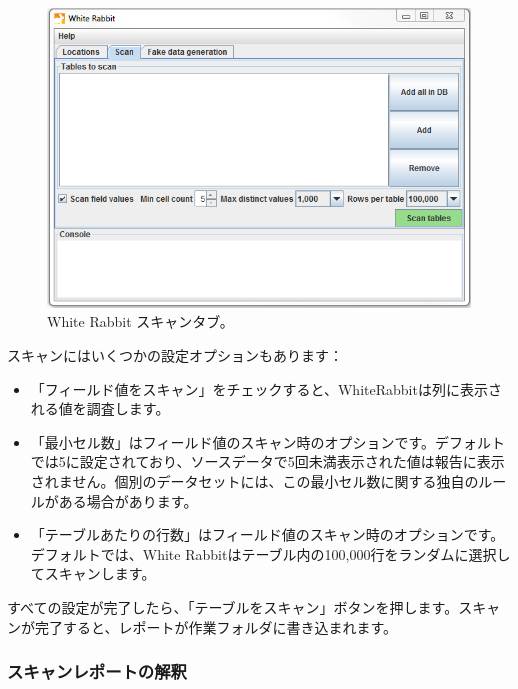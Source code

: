 \documentclass[
  11pt]{book}
\providecommand{\tightlist}{%
  \setlength{\itemsep}{0pt}\setlength{\parskip}{0pt}}
\theoremstyle{definition}
\theoremstyle{definition}
\theoremstyle{definition}
\theoremstyle{definition}
\theoremstyle{remark}
\begin{document}
\begin{figure}

{\centering \includegraphics[width=1\linewidth]{images/ExtractTransformLoad/WhiteRabbitAddTables} 

}

\caption{White Rabbit スキャンタブ。}\label{fig:WhiteRabbitAddTables}
\end{figure}

スキャンにはいくつかの設定オプションもあります：

\begin{itemize}
\tightlist
\item
  「フィールド値をスキャン」をチェックすると、WhiteRabbitは列に表示される値を調査します。
\item
  「最小セル数」はフィールド値のスキャン時のオプションです。デフォルトでは5に設定されており、ソースデータで5回未満表示された値は報告に表示されません。個別のデータセットには、この最小セル数に関する独自のルールがある場合があります。
\item
  「テーブルあたりの行数」はフィールド値のスキャン時のオプションです。デフォルトでは、White Rabbitはテーブル内の100,000行をランダムに選択してスキャンします。
\end{itemize}

すべての設定が完了したら、「テーブルをスキャン」ボタンを押します。スキャンが完了すると、レポートが作業フォルダに書き込まれます。

\subsubsection*{スキャンレポートの解釈}\label{ux30b9ux30adux30e3ux30f3ux30ecux30ddux30fcux30c8ux306eux89e3ux91c8}
\end{document}
